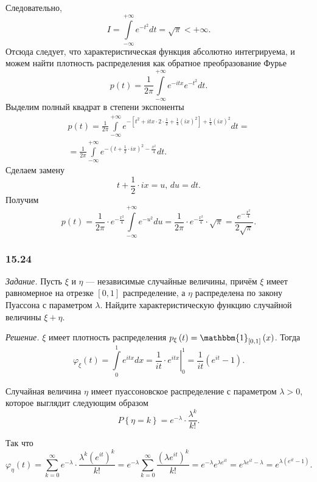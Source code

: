 \begin{enumerate}[label=\alph*)]
Следовательно,
$$I =
  \int \limits_{- \infty }^{+ \infty } e^{- t^2} dt =
  \sqrt{ \pi } <
  + \infty.$$
Отсюда следует, что характеристическая функция абсолютно интегрируема,
и можем найти плотность распределения как обратное преобразование Фурье
$$p \left( t \right) =
  \frac{1}{2 \pi } \int \limits_{- \infty }^{+ \infty } e^{- itx} e^{- t^2} dt.$$
Выделим полный квадрат в степени экспоненты
\begin{equation*}
\begin{split}
  p \left( t \right) =
  \frac{1}{2 \pi }
  \int \limits_{- \infty }^{+ \infty }
    e^{- \left[ t^2 + itx \cdot 2 \cdot \frac{1}{2} + \frac{1}{4} \left( ix \right)^2 \right] +
    \frac{1}{4} \left( ix \right)^2} dt = \\
  = \frac{1}{2 \pi }
  \int \limits_{- \infty }^{+ \infty }
    e^{- \left( t + \frac{1}{2} \cdot ix \right)^2 - \frac{x^2}{4}} dt.
\end{split}
\end{equation*}
Сделаем замену
$$t + \frac{1}{2} \cdot ix = u, \,
  du = dt.$$
Получим
$$p \left( t \right) =
  \frac{1}{2 \pi } \cdot e^{- \frac{x^2}{4}} \int \limits_{- \infty }^{+ \infty } e^{- u^2} du =
  \frac{1}{2 \pi } \cdot e^{- \frac{x^2}{4}} \cdot \sqrt{ \pi } =
  \frac{e^{- \frac{x^2}{4}}}{2 \sqrt{ \pi }}.$$
\end{enumerate}

\subsubsection*{15.24}

\textit{Задание.}
Пусть $ \xi $ и $ \eta $ --- независимые случайные величины,
причём $ \xi $ имеет равномерное на отрезке $ \left[ 0, 1 \right] $ распределение,
а $ \eta $ распределена по закону Пуассона с параметром $ \lambda $.
Найдите характеристическую функцию случайной величины $ \xi + \eta $.

\textit{Решение.}
$ \xi $ имеет плотность распределения
$p_{ \xi } \left( t \right) =
  \mathbbm{1}_{ \left[ 0, 1 \right] } \left( x \right) $.
Тогда
$$ \varphi_{ \xi } \left( t \right) =
  \int \limits_0^1 e^{itx} dx =
  \left. \frac{1}{it} \cdot e^{itx} \right|_0^1 =
  \frac{1}{it} \left( e^{it} - 1 \right).$$

Случайная величина $ \eta $ имеет пуассоновское распределение с параметром $ \lambda > 0$,
которое выглядит следующим образом
$$P \left\{ \eta = k \right\} =
  e^{- \lambda } \cdot \frac{ \lambda^k}{k!}.$$

Так что
$$ \varphi_{ \eta } \left( t \right) =
  \sum \limits_{k = 0}^{ \infty }
    e^{- \lambda } \cdot \frac{ \lambda^k \left( e^{it} \right)^k}{k!} =
  e^{- \lambda } \sum \limits_{k = 0}^{ \infty } \frac{ \left( \lambda e^{it} \right)^k}{k!} =
  e^{- \lambda } e^{ \lambda e^{it}} =
  e^{ \lambda e^{it} - \lambda } =
  e^{ \lambda \left( e^{it} - 1 \right) }.$$

